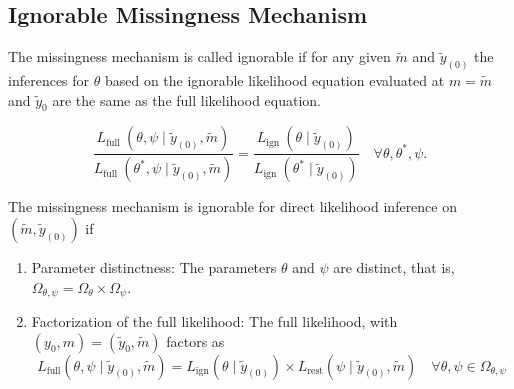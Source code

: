 \subsection{Ignorable Missingness Mechanism}

\begin{definition}
    The missingness mechanism is called ignorable if for any given $\tilde{m}$ and  $\tilde{y}_{(0)}$ the inferences for $\theta$ based on the ignorable likelihood equation evaluated at $m=\tilde{m}$ and $\tilde{y}_{0}$ are the same as the full likelihood equation.
\end{definition}

\begin{remark}
    \begin{equation}
        \frac{L_{\text {full }}\left(\theta, \psi \mid \tilde{y}_{(0)}, \tilde{m}\right)}{L_{\text {full }}\left(\theta^{*}, \psi \mid \tilde{y}_{(0)}, \tilde{m}\right)}=\frac{L_{\text {ign }}\left(\theta \mid \tilde{y}_{(0)}\right)}{L_{\text {ign }}\left(\theta^{*} \mid \tilde{y}_{(0)}\right)} \quad \forall \theta, \theta^{*}, \psi .
    \end{equation}
\end{remark}

\begin{theorem}
    The missingness mechanism is ignorable for direct likelihood inference on $\left(\tilde{m},\tilde{y}_{(0)}\right)$ if
    \begin{enumerate}
        \item Parameter distinctness: The parameters $\theta$ and $\psi$ are distinct, that is, $\Omega_{\theta, \psi}=\Omega_{\theta} \times \Omega_{\psi}$.
        \item Factorization of the full likelihood: The full likelihood, with $\left(y_{0}, m\right)=\left(\tilde{y}_{0}, \tilde{m}\right)$ factors as
              \begin{equation}
                  L_{\text{full}}\left(\theta,\psi\mid\tilde{y}_{(0)},\tilde{m}\right)=L_{\text{ign}}\left(\theta\mid\tilde{y}_{(0)}\right)\times L_{\text{rest}}\left(\psi\mid\tilde{y}_{(0)},\tilde{m}\right)\quad\forall\theta,\psi\in\Omega_{\theta,\psi}
                  \label{equation:factorization-of-the-full-likelihood}
              \end{equation}
    \end{enumerate}
\end{theorem}

